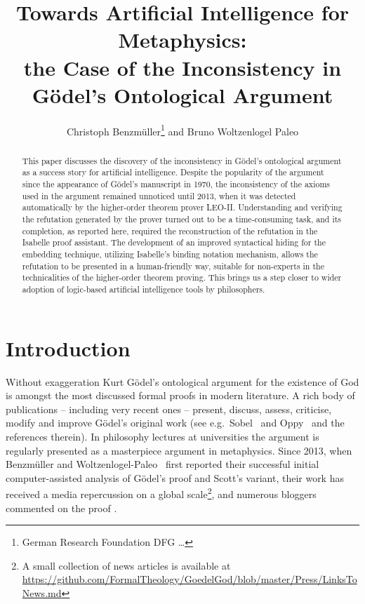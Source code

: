 \documentclass{article}
\title{Towards Artificial Intelligence for Metaphysics: \\ the Case of the Inconsistency in G\"odel's Ontological Argument}
\author{Christoph Benzm\"uller\thanks{German Research Foundation DFG \ldots} and Bruno Woltzenlogel Paleo}
\author{}
\begin{document}
\maketitle

\begin{abstract}
  This paper discusses the discovery of the inconsistency in G\"odel's ontological argument as a success story for artificial intelligence. Despite the popularity of the argument since the appearance of G\"odel's manuscript in 1970, the inconsistency of the axioms used in the argument remained unnoticed until 2013, when it was detected automatically by the higher-order theorem prover LEO-II. Understanding and verifying the refutation generated by the prover turned out to be a time-consuming task, and its completion, as reported here, required the reconstruction of the refutation in the Isabelle proof assistant. The development of an improved syntactical hiding for the embedding technique, utilizing Isabelle's binding notation mechanism, allows the refutation to be presented in a human-friendly way, suitable for non-experts in the technicalities of the higher-order theorem proving. This brings us a step closer to wider adoption of logic-based artificial intelligence tools by philosophers.
\end{abstract}


\section{Introduction}
Without exaggeration Kurt G\"{o}del's ontological
argument for the existence of God \cite{GoedelNotes,ScottNotes} is
amongst the most discussed formal proofs in modern literature. A rich
body of publications -- including very recent ones -- present,
discuss, assess, criticise, modify and improve G\"{o}del's original
work (see e.g.~Sobel~ and Oppy~ and the
references therein).  In philosophy lectures at universities the
argument is regularly presented as a masterpiece argument in
metaphysics. Since 2013, when Benzm\"uller and Woltzenlogel-Paleo~ first
reported their successful initial computer-assisted
analysis of G\"odel's proof and Scott's variant,
their work has received a media repercussion on a global scale\footnote{A
  small collection of news articles is available at {\scriptsize
    \url{https://github.com/FormalTheology/GoedelGod/blob/master/Press/LinksToNews.md}}},
and numerous bloggers commented on the proof
\cite{fuhrmann15:_blogg_goedel}.
\end{document}
